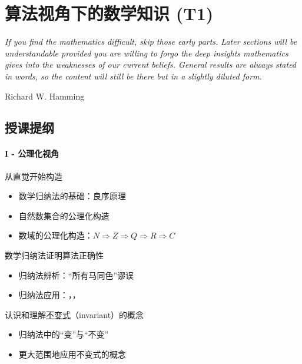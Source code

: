 \chapter{算法视角下的数学知识 (T1)}

\begin{flushright}
\parbox{0.7\columnwidth}{\flushright \textit{\textsf{
    If you find the mathematics difficult, skip those early parts. 
    Later sections will be understandable 
    provided you are willing to forgo the deep insights mathematics 
    gives into the weaknesses of our current beliefs. 
    General results are always stated in words, 
    so the content will still be there but in a slightly diluted form.\\}}
\parbox{0.7\columnwidth}{\flushright \textsf{\textsf{\textemdash} 
    Richard W. Hamming \cite{Hamming05}}}
}
\end{flushright}


\section*{授课提纲}

\subsubsection{I - 公理化视角}

\nid 从直觉开始构造
\begin{itemize}
    \item 数学归纳法的基础：良序原理
    \item 自然数集合的公理化构造
    \item 数域的公理化构造：$N \Rightarrow Z \Rightarrow Q \Rightarrow R \Rightarrow C$
\end{itemize}

\nid 数学归纳法证明算法正确性
\begin{itemize}
    \item 归纳法辨析：“所有马同色”谬误
    \item 归纳法应用：，，
\end{itemize}

\nid 认识和理解\ul{不变式}（invariant）的概念
\begin{itemize}
    \item 归纳法中的“变”与“不变”
    \item 更大范围地应用不变式的概念
\end{itemize}

